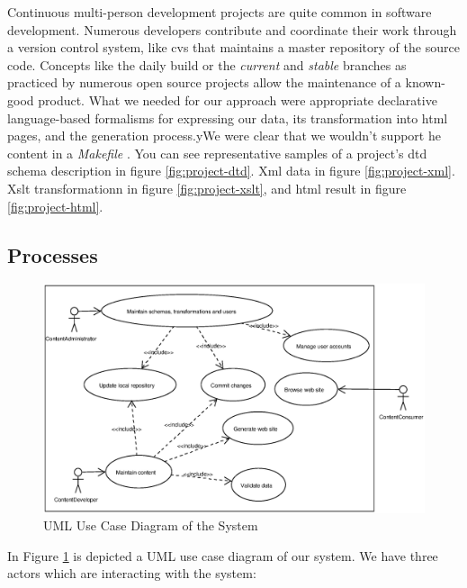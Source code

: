 \documentclass[10pt]{article}
\begin{document}
Continuous multi-person development projects are quite
common in software development.
Numerous developers contribute and coordinate their work
through a version control system, like {\sc cvs} that
maintains a master repository of the source code.
Concepts like the daily build \cite{CS95b} or the
{\em current} and {\em stable} branches as practiced by
numerous open source projects allow the maintenance
of a known-good product.
What we needed for our approach were appropriate
declarative language-based formalisms for expressing our data,
its transformation into {\sc html} pages, and the
generation process.yWe were clear that we wouldn't support he content in a {\em Makefile} \cite{OTT91}.
You can see representative samples of a project's
{\sc dtd} schema description in figure \ref{fig:project-dtd}.
{\sc Xml} data in figure \ref{fig:project-xml}.
{\sc Xslt} transformationn in figure \ref{fig:project-xslt},
and {\sc html} result in figure \ref{fig:project-html}.

\subsection{Processes}

\begin{figure}[h!]
\includegraphics[scale=0.5]{use-case-diagram}
\caption{UML Use Case Diagram of the System}
\label{fig:use-case-diagram}
\end{figure}

In Figure \ref{fig:use-case-diagram} is depicted a UML use case diagram of our system. 
We have three actors which are interacting with the system:
\end{document}
